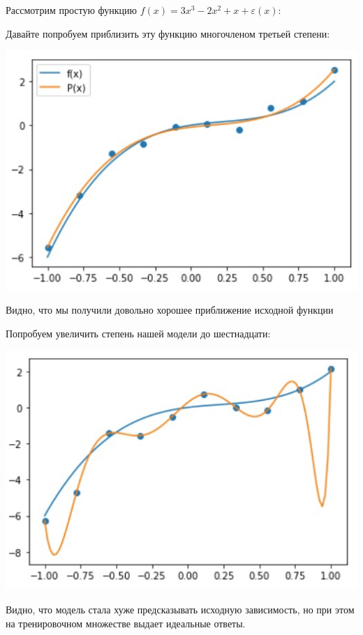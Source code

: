 Рассмотрим простую функцию $f(x) = 3x^3 - 2x^2 + x + \varepsilon(x)$:

Давайте попробуем приблизить эту функцию многочленом третьей степени: 
\begin{center}
    \includegraphics[scale=0.5]{tickets/pictures/polynom3degree.png}
\end{center}
Видно, что мы получили довольно хорошее приближение исходной функции

Попробуем увеличить степень нашей модели до шестнадцати:
\begin{center}
    \includegraphics[scale=0.5]{tickets/pictures/polynom16degree.png}
\end{center}

Видно, что модель стала хуже предсказывать исходную зависимость, но при этом на тренировочном множестве выдает идеальные ответы.

